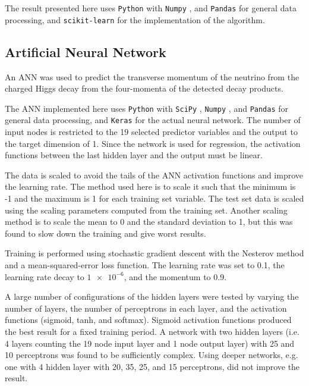 \documentclass[twocolumn]{scrartcl}
\begin{document}
The result presented here uses \texttt{Python} with \texttt{Numpy} \cite{numpy}, and \texttt{Pandas} \cite{pandas} for general data processing, and \texttt{scikit-learn} \cite{scikit-learn} for the implementation of the algorithm.


\subsection{Artificial Neural Network}

An \gls{ANN} was used to predict the transverse momentum of the neutrino from the charged Higgs decay from the four-momenta of the detected decay products. 

The \gls{ANN} implemented here uses \texttt{Python} with \texttt{SciPy} \cite{scipy}, \texttt{Numpy} \cite{numpy}, and \texttt{Pandas} \cite{pandas} for general data processing, and \texttt{Keras} \cite{keras} for the actual neural network. The number of input nodes is restricted to the 19 selected predictor variables and the output to the target dimension of 1. Since the network is used for regression, the activation functions between the last hidden layer and the output must be linear.

The data is scaled to avoid the tails of the \gls{ANN} activation functions and improve the learning rate. The method used here is to scale it such that the minimum is -1 and the maximum is 1 for each training set variable. The test set data is scaled using the scaling parameters computed from the training set. Another scaling method is to scale the mean to 0 and the standard deviation to 1, but this was found to slow down the training and give worst results.

Training is performed using stochastic gradient descent with the Nesterov method \cite{nesterov} and a mean-squared-error loss function. The learning rate was set to 0.1, the learning rate decay to $\num{1e-6}$, and the momentum to 0.9.

A large number of configurations of the hidden layers were tested by varying the number of layers, the number of perceptrons in each layer, and the activation functions (sigmoid, tanh, and softmax). Sigmoid activation functions produced the best result for a fixed training period. A network with two hidden layers (i.e. 4 layers counting the 19 node input layer and 1 node output layer) with 25 and 10 perceptrons was found to be sufficiently complex. Using deeper networks, e.g. one with 4 hidden layer with 20, 35, 25, and 15 perceptrons, did not improve the result.
\end{document}

